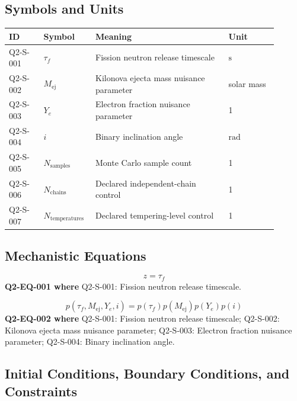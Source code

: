 \documentclass[11pt]{article}
\begin{document}
\subsection{Symbols and Units}

\begin{center}
\small
\begin{tabular}{|p{0.12\linewidth}|p{0.15\linewidth}|p{0.46\linewidth}|p{0.17\linewidth}|}
\hline
ID & Symbol & Meaning & Unit \\ \hline
Q2-S-001 & $\tau_f$ & Fission neutron release timescale & $\mathrm{s}$ \\ \hline
Q2-S-002 & $M_{\mathrm{ej}}$ & Kilonova ejecta mass nuisance parameter & solar mass \\ \hline
Q2-S-003 & $Y_e$ & Electron fraction nuisance parameter & 1 \\ \hline
Q2-S-004 & $i$ & Binary inclination angle & $\mathrm{rad}$ \\ \hline
Q2-S-005 & $N_{\mathrm{samples}}$ & Monte Carlo sample count & 1 \\ \hline
Q2-S-006 & $N_{\mathrm{chains}}$ & Declared independent-chain control & 1 \\ \hline
Q2-S-007 & $N_{\mathrm{temperatures}}$ & Declared tempering-level control & 1 \\ \hline
\end{tabular}
\end{center}

\subsection{Mechanistic Equations}

\begin{equation}\label{eq:Q2-EQ-001}
z=\tau_f
\end{equation}
\noindent\textbf{Q2-EQ-001 where} Q2-S-001: Fission neutron release timescale.

\begin{equation}\label{eq:Q2-EQ-002}
p(\tau_f,M_{\mathrm{ej}},Y_e,i)=p(\tau_f)p(M_{\mathrm{ej}})p(Y_e)p(i)
\end{equation}
\noindent\textbf{Q2-EQ-002 where} Q2-S-001: Fission neutron release timescale; Q2-S-002: Kilonova ejecta mass nuisance parameter; Q2-S-003: Electron fraction nuisance parameter; Q2-S-004: Binary inclination angle.

\subsection{Initial Conditions, Boundary Conditions, and Constraints}
\end{document}
